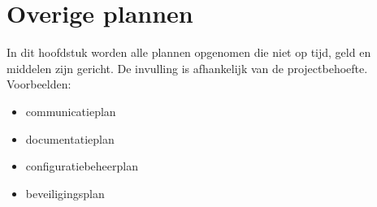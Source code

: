 \section{Overige plannen}

In dit hoofdstuk worden alle plannen opgenomen die niet op tijd, geld en middelen zijn gericht.
De invulling is afhankelijk van de projectbehoefte.
Voorbeelden:
\begin{itemize}
  \item communicatieplan
  \item documentatieplan
  \item configuratiebeheerplan
  \item beveiligingsplan
\end{itemize}

